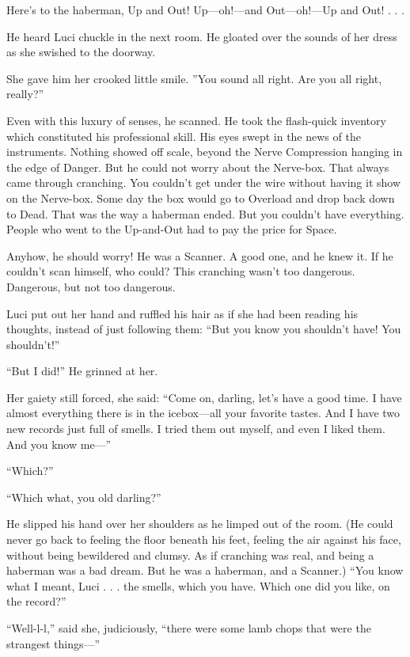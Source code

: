  
Here's to the haberman, Up and Out!
Up---oh!---and Out---oh!---Up and Out! . . .

 

He heard Luci chuckle in the next room. He gloated over the sounds of her dress as she swished to the doorway.

She gave him her crooked little smile. ''You sound all right. Are you all right, really?''

Even with this luxury of senses, he scanned. He took the flash-quick inventory which constituted his professional skill. His eyes swept in the news of the instruments. Nothing showed off scale, beyond the Nerve Compression hanging in the edge of Danger. But he could not worry about the Nerve-box. That always came through cranching. You couldn't get under the wire without having it show on the Nerve-box. Some day the box would go to Overload and drop back down to Dead. That was the way a haberman ended. But you couldn't have everything. People who went to the Up-and-Out had to pay the price for Space.

Anyhow, he should worry! He was a Scanner. A good one, and he knew it. If he couldn't scan himself, who could? This cranching wasn't too dangerous. Dangerous, but not too dangerous.

Luci put out her hand and ruffled his hair as if she had been reading his thoughts, instead of just following them: ``But you know you shouldn't have! You shouldn't!''

``But I did!'' He grinned at her.

Her gaiety still forced, she said: ``Come on, darling, let's have a good time. I have almost everything there is in the icebox---all your favorite tastes. And I have two new records just full of smells. I tried them out myself, and even I liked them. And you know me---''

``Which?''

``Which what, you old darling?''

He slipped his hand over her shoulders as he limped out of the room. (He could never go back to feeling the floor beneath his feet, feeling the air against his face, without being bewildered and clumsy. As if cranching was real, and being a haberman was a bad dream. But he was a haberman, and a Scanner.) ``You know what I meant, Luci . . . the smells, which you have. Which one did you like, on the record?''

``Well-l-l,'' said she, judiciously, ``there were some lamb chops that were the strangest things---''

